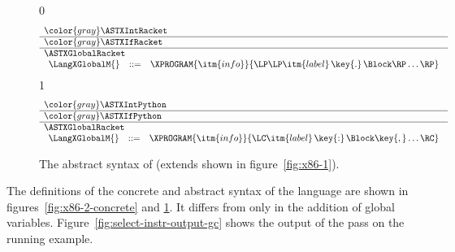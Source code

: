 \documentclass[7x10]{TimesAPriori_MIT}%
\newcommand{\gray}[1]{{\color{gray} #1}}
\def\racketEd{0}
\def\pythonEd{1}
\def\edition{1}
\newcommand{\pythonColor}[0]{}
\numberwithin{theorem}{chapter}
\numberwithin{definition}{chapter}
\numberwithin{equation}{chapter}
\begin{document}
\begin{figure}[tp]
\begin{tcolorbox}[colback=white]
    \small
{\if\edition\racketEd    
\[
\begin{array}{l}
  \gray{\ASTXIntRacket} \\ \hline
  \gray{\ASTXIfRacket} \\ \hline
  \ASTXGlobalRacket \\
\begin{array}{lcl}
\LangXGlobalM{} &::= & \XPROGRAM{\itm{info}}{\LP\LP\itm{label} \,\key{.}\, \Block \RP\ldots\RP}
\end{array}
\end{array}
\]
\fi}
{\if\edition\pythonEd\pythonColor
\[
\begin{array}{l}
  \gray{\ASTXIntPython} \\ \hline
  \gray{\ASTXIfPython} \\ \hline
  \ASTXGlobalRacket \\
\begin{array}{lcl}
\LangXGlobalM{} &::= & \XPROGRAM{\itm{info}}{\LC\itm{label} \,\key{:}\, \Block \key{,} \ldots \RC }
\end{array}
\end{array}
\]
\fi}
\end{tcolorbox}

\caption{The abstract syntax of \LangXGlobal{} (extends \LangXIf{} shown in figure~\ref{fig:x86-1}).}
\label{fig:x86-2}
\end{figure}

The definitions of the concrete and abstract syntax of the
\LangXGlobal{} language are shown in figures~\ref{fig:x86-2-concrete}
and \ref{fig:x86-2}.  It differs from \LangXIf{} only in the addition
of global variables.
%
Figure~\ref{fig:select-instr-output-gc} shows the output of the
 pass on the running example.
\end{document}
